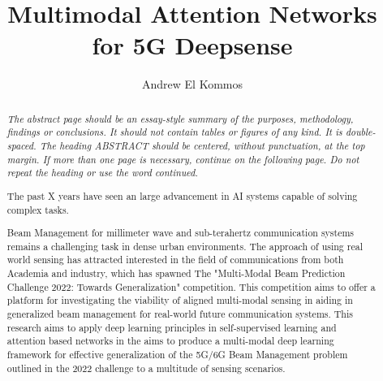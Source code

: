 \documentclass{UCF_ETD}
\title{Multimodal Attention Networks for 5G Deepsense} %
\author{Andrew El Kommos} %
\begin{document}
\frontmatter

\maketitle


\begin{abstract}
\textit{The abstract page should be an essay-style summary of the purposes, methodology, findings or conclusions. It should not contain tables or figures of any kind. It is double-spaced. The heading ABSTRACT should be centered, without punctuation, at the top margin. If more than one page is necessary, continue on the following page. Do not repeat the heading or use the word continued.}

The past X years have seen an large advancement in AI systems capable of solving complex tasks.



Beam Management for millimeter wave and sub-terahertz communication systems remains a challenging task in dense urban environments. The approach of using real world sensing has attracted interested in the field of communications from both Academia and industry, which has spawned The "Multi-Modal Beam Prediction Challenge 2022: Towards Generalization" competition. This competition aims to offer a platform for investigating the viability of aligned multi-modal sensing in aiding in generalized beam management for real-world future communication systems. This research aims to apply deep learning principles in self-supervised learning and attention based networks in the aims to produce a multi-modal deep learning framework for effective generalization of the 5G/6G Beam Management problem outlined in the 2022 challenge to a multitude of sensing scenarios.\cite{charan2022multi}



\end{abstract}

\dedication{I dedicate this thesis to my parents, and siblings for supporting me to continue through my education...etc}
\end{document}
